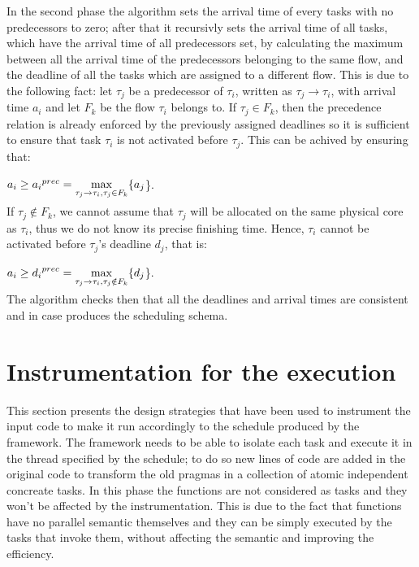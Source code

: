 \documentclass[a4paper,12pt,oneside]{book}
\begin{document}
In the second phase the algorithm sets the arrival time of every tasks with no predecessors to zero; after that it recursivly sets the arrival time of all tasks, which have the arrival time of all predecessors set, by calculating the maximum between all the arrival time of the predecessors belonging to the same flow, and the deadline of all the tasks which are assigned to a different flow. This is due to the following fact: let $\tau_j$ be a predecessor of $\tau_i$, written as $\tau_j \rightarrow \tau_i$, with arrival time $a_i$ and let $F_k$ be the flow $\tau_i$ belongs to. If $\tau_j \in F_k$, then the precedence relation is already enforced by the previously assigned deadlines so it is sufficient to ensure that task $\tau_i$ is not activated before $\tau_j$. This can be achived by ensuring that:
\begin{center}$ a_i \ge  {a_i}^{prec} = \smash{\displaystyle\max_{\tau_j \rightarrow \tau_i,\tau_j \in F_k} }\{a_j$\}.\end{center}
If $\tau_j \notin F_k$, we cannot assume that $\tau_j$ will be allocated on the same physical core as $\tau_i$, thus we do not know its precise finishing time. Hence, $\tau_i$ cannot be activated before $\tau_j$'s deadline $d_j$, that is:
\begin{center}$ a_i \ge  {d_i}^{prec} = \smash{\displaystyle\max_{\tau_j \rightarrow \tau_i,\tau_j \notin F_k} }\{d_j$\}.\end{center}
The algorithm checks then that all the deadlines and arrival times are consistent and in case produces the scheduling schema.

\section{Instrumentation for the execution}
\label{designexecution}

This section presents the design strategies that have been used to instrument the input code to make it run accordingly to the schedule produced by the framework. The framework needs to be able to isolate each task and execute it in the thread specified by the schedule; to do so new lines of code are added in the original code to transform the old pragmas in a collection of atomic independent concreate tasks. In this phase the functions are not considered as tasks and they won’t be affected by the instrumentation. This is due to the fact that functions have no parallel semantic themselves and they can be simply executed by the tasks that invoke them, without affecting the semantic and improving the efficiency.
\end{document}
